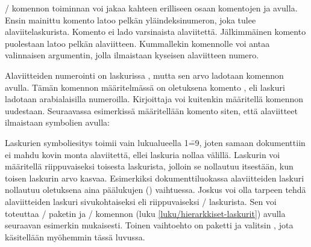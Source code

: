 \-/ komennon toiminnan voi jakaa kahteen erilliseen
osaan komentojen  ja 
avulla. Ensin mainittu komento latoo pelkän yläindeksinumeron, joka
tulee alaviitelaskurista. Komento ei lado varsinaista alaviitettä.
Jälkimmäinen komento puolestaan latoo pelkän alaviitteen. Kummallekin
komennolle voi antaa valinnaisen argumentin, jolla ilmaistaan kyseisen
alaviitteen numero.

\begin{koodilohkosis}
\footnotemark[numero]                      %
\end{koodilohkosis}

Alaviitteiden numerointi on laskurissa , mutta sen
arvo ladotaan komennon  avulla. Tämän komennon
määritelmässä on oletuksena komento
, eli laskuri ladotaan
arabialaisilla numeroilla. Kirjoittaja voi kuitenkin määritellä komennon
uudestaan. Seuraavassa esimerkissä määritellään komento siten, että
alaviitteet ilmaistaan symbolien avulla:

\begin{koodilohkosis}
\renewcommand{\thefootnote}{\fnsymbol{footnote}}
\end{koodilohkosis}

Laskurien symboliesitys toimii vain lukualueella 1\==9, joten samaan
dokumenttiin ei mahdu kovin monta alaviitettä, ellei laskuria nollaa
välillä. Laskurin voi määritellä riippuvaiseksi toisesta laskurista,
jolloin se nollautuu itsestään, kun toisen laskurin arvo kasvaa.
Esimerkiksi dokumenttiluokassa  alaviitteiden laskuri
nollautuu oletuksena aina päälukujen () vaihtuessa.
Joskus voi olla tarpeen tehdä alaviitteiden laskuri sivukohtaiseksi eli
riippuvaiseksi \-/ laskurista. Sen voi toteuttaa
\-/ paketin ja \-/ komennon
(luku \ref{luku/hierarkkiset-laskurit}) avulla seuraavan esimerkin
mukaisesti. Toinen vaihtoehto on paketti  ja valitsin
, jota käsitellään myöhemmin tässä luvussa.

\begin{koodilohkosis}
\end{koodilohkosis}

